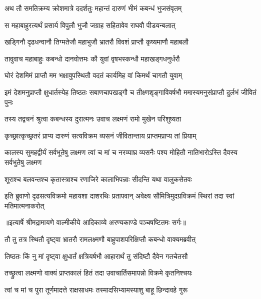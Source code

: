 \twolineshloka
{अथ तौ समतिक्रम्य क्रोशमात्रे ददर्शतुः}
{महान्तं दारुणं भीमं कबन्धं भुजसंवृतम्} %

\twolineshloka
{स महाबाहुरत्यर्थं प्रसार्य विपुलौ भुजौ}
{जग्राह सहितावेव राघवौ पीडयन्बलात्} %

\twolineshloka
{खड्गिनौ दृढधन्वानौ तिग्मतेजौ महाभुजौ}
{भ्रातरौ विवशं प्राप्तौ कृष्यमाणौ महाबलौ} %

\twolineshloka
{तावुवाच महाबाहुः कबन्धो दानवोत्तमः}
{कौ युवां वृषभस्कन्धौ महाखड्गधनुर्धरौ} %

\twolineshloka
{घोरं देशमिमं प्राप्तौ मम भक्षावुपस्थितौ}
{वदतं कार्यमिह वां किमर्थं चागतौ युवाम्} %

\threelineshloka
{इमं देशमनुप्राप्तौ क्षुधार्तस्येह तिष्ठतः}
{सबाणचापखड्गौ च तीक्ष्णशृङ्गाविवर्षभौ}
{ममास्यमनुसंप्राप्तौ दुर्लभं जीवितं पुनः} %

\twolineshloka
{तस्य तद्वचनं श्रुत्वा कबन्धस्य दुरात्मनः}
{उवाच लक्ष्मणं रामो मुखेन परिशुष्यता} %

\twolineshloka
{कृच्छ्रात्कृच्छ्रतरं प्राप्य दारुणं सत्यविक्रम}
{व्यसनं जीवितान्ताय प्राप्तमप्राप्य तां प्रियाम्} %

\threelineshloka
{कालस्य सुमहद्वीर्यं सर्वभूतेषु लक्ष्मण}
{त्वां च मां च नरव्याघ्र व्यसनैः पश्य मोहितौ}
{नातिभारोऽस्ति दैवस्य सर्वभुतेषु लक्ष्मण} %

\twolineshloka
{शूराश्च बलवन्तश्च कृतास्त्राश्च रणाजिरे}
{कालाभिपन्नाः सीदन्ति यथा वालुकसेतवः} %

\fourlineindentedshloka
{इति ब्रुवाणो दृढसत्यविक्रमो}
{ महायशा दाशरथिः प्रतापवान्}
{अवेक्ष्य सौमित्रिमुदग्रविक्रमं}
{ स्थिरां तदा स्वां मतिमात्मनाकरोत्} %


{॥इत्यार्षे श्रीमद्रामायणे वाल्मीकीये आदिकाव्ये अरण्यकाण्डे पञ्चषष्टितमः सर्गः॥}


\twolineshloka
{तौ तु तत्र स्थितौ दृष्ट्वा भ्रातरौ रामलक्ष्मणौ}
{बाहुपाशपरिक्षिप्तौ कबन्धो वाक्यमब्रवीत्} %

\twolineshloka
{तिष्ठतः किं नु मां दृष्ट्वा क्षुधार्तं क्षत्रियर्षभौ}
{आहारार्थं तु संदिष्टौ दैवेन गतचेतसौ} %

\twolineshloka
{तच्छ्रुत्वा लक्ष्मणो वाक्यं प्राप्तकालं हितं तदा}
{उवाचार्तिसमापन्नो विक्रमे कृतनिश्चयः} %

\twolineshloka
{त्वां च मां च पुरा तूर्णमादत्ते राक्षसाधमः}
{तस्मादसिभ्यामस्याशु बाहू छिन्दावहे गुरू} %

